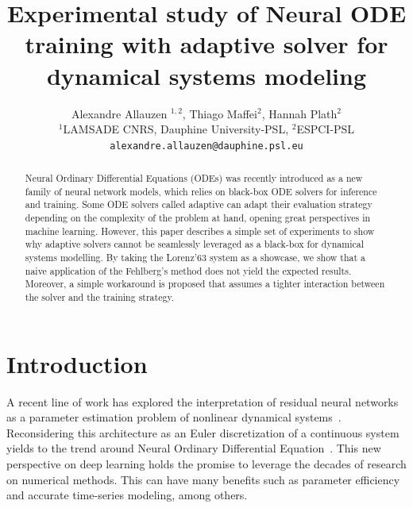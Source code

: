 \documentclass{article}
\title{Experimental study of Neural ODE training with adaptive solver
  for dynamical systems modeling}
\author{%
  Alexandre Allauzen $^{1,2}$, Thiago Maffei$^{2}$, Hannah Plath$^{2}$\\
  $^{1}$LAMSADE CNRS, Dauphine University-PSL, $^{2}$ESPCI-PSL \\
  \texttt{alexandre.allauzen@dauphine.psl.eu}
}
\begin{document}
\maketitle

\begin{abstract}
  Neural Ordinary Differential Equations (ODEs) was recently
  introduced as a new family of neural network models, which relies on
  black-box ODE solvers for inference and training. Some ODE solvers
  called adaptive can adapt their evaluation strategy depending on the
  complexity of the problem at hand, opening great perspectives in
  machine learning. However, this paper describes a simple set of
  experiments to show why adaptive solvers cannot be seamlessly
  leveraged as a black-box for dynamical systems modelling. By taking
  the Lorenz'63 system as a showcase, we show that a naive application
  of the Fehlberg's method does not yield the expected
  results. Moreover, a simple workaround is proposed that assumes a
  tighter interaction between the solver and the training strategy.
\end{abstract}

\section{Introduction}
\label{sec:intro}



A recent line of work has explored the interpretation of residual
neural networks~\cite{He16Deep} as a parameter estimation problem of
nonlinear dynamical
systems~\cite{Haber17Stable,WE17Proposal,Lu18Beyond}.  Reconsidering
this architecture as an Euler discretization of a continuous system
yields to the trend around Neural Ordinary Differential
Equation~\cite{Chen18NODE}.  This new perspective on deep learning
holds the promise to leverage the decades of research on numerical
methods. This can have many benefits such as parameter efficiency and
accurate time-series modeling, among others.
\end{document}
